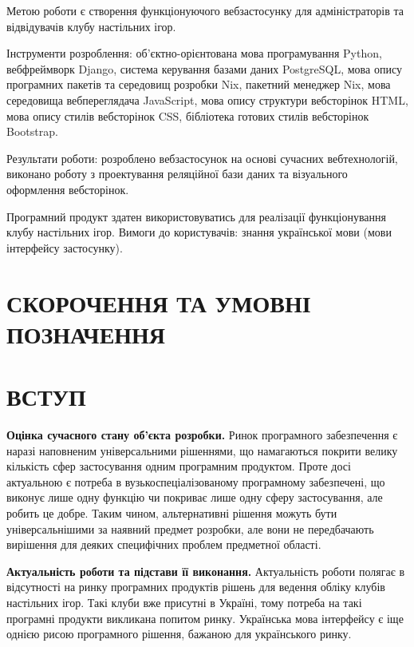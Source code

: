 \documentclass[a4paper, 14pt]{extarticle}
\begin{document}
  Метою роботи є створення функціонуючого вебзастосунку для адміністраторів та
  відвідувачів клубу настільних ігор.

  Інструменти розроблення: об'єктно-орієнтована мова програмування Python,
  вебфреймворк Django, система керування базами даних PostgreSQL, мова опису програмних
  пакетів та середовищ розробки Nix, пакетний менеджер Nix,
  мова середовища вебпереглядача JavaScript, мова
  опису структури вебсторінок HTML, мова опису стилів вебсторінок CSS, бібліотека
  готових стилів вебсторінок Bootstrap.

  Результати роботи: розроблено вебзастосунок на основі сучасних вебтехнологій,
  виконано роботу з проектування реляційної бази даних та візуального оформлення
  вебсторінок.

  Програмний продукт здатен використовуватись для реалізації функціонування
  клубу настільних ігор. Вимоги до користувачів: знання української мови (мови
  інтерфейсу застосунку).

  \clearpage

  \tableofcontents\thispagestyle{myheadings}

  \clearpage

  \section{СКОРОЧЕННЯ ТА УМОВНІ ПОЗНАЧЕННЯ}

  \section{ВСТУП}

  \textbf{Оцінка сучасного стану об'єкта розробки.}
  Ринок програмного забезпечення є наразі наповненим універсальними рішеннями,
  що намагаються покрити велику кількість сфер застосування одним програмним
  продуктом. Проте досі актуальною є потреба в вузькоспеціалізованому програмному
  забезпечені, що виконує лише одну функцію чи покриває лише одну сферу застосування,
  але робить це добре. Таким чином, альтернативні рішення можуть бути універсальнішими
  за наявний предмет розробки, але вони не передбачають вирішення
  для деяких специфічних проблем предметної області.

  \textbf{Актуальність роботи та підстави її виконання.}
  Актуальність роботи полягає в відсутності на ринку програмних продуктів рішень
  для ведення обліку клубів настільних ігор. Такі клуби вже присутні в Україні,
  тому потреба на такі програмні продукти викликана попитом ринку. Українська мова
  інтерфейсу є іще однією рисою програмного рішення, бажаною для українського ринку.
\end{document}
